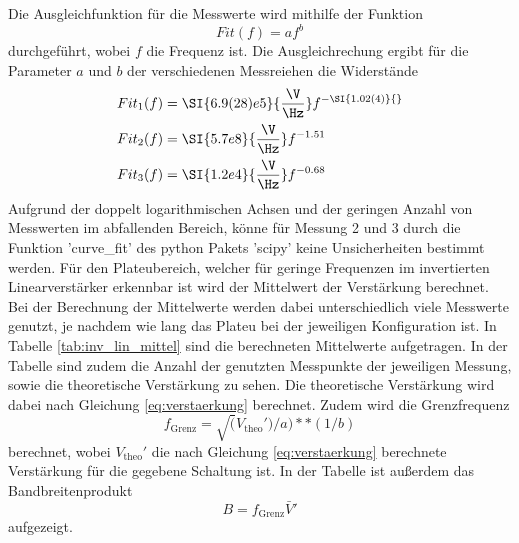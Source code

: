 Die Ausgleichfunktion für die Messwerte wird mithilfe der Funktion
\begin{equation}
    Fit(f) = a f^b
    \label{eq:fit}
\end{equation}
durchgeführt, wobei $f$ die Frequenz ist.
Die Ausgleichrechung ergibt für die Parameter $a$ und $b$ der verschiedenen Messreiehen die Widerstände
\begin{align}
    Fit_1(f) &= \SI{6.9(28)e5}{\frac{\V}{\Hz}} f^{-\SI{1.02(4)}{}} \\
    Fit_2(f) &= \SI{5.7e8}{\frac{\V}{\Hz}} f^{-1.51}\\
    Fit_3(f) &= \SI{1.2e4}{\frac{\V}{\Hz}} f^{-0.68}
\end{align}
Aufgrund der doppelt logarithmischen Achsen und der geringen Anzahl von Messwerten im abfallenden Bereich, könne für Messung 2 und 3 durch die Funktion 'curve\_fit' des python Pakets 'scipy' \cite{scipy} keine Unsicherheiten bestimmt werden.
Für den Plateubereich, welcher für geringe Frequenzen im invertierten Linearverstärker erkennbar ist wird der Mittelwert der Verstärkung berechnet.
Bei der Berechnung der Mittelwerte werden dabei unterschiedlich viele Messwerte genutzt, je nachdem wie lang das Plateu bei der jeweiligen Konfiguration ist.
In Tabelle \ref{tab:inv_lin_mittel} sind die berechneten Mittelwerte aufgetragen. 
In der Tabelle sind zudem die Anzahl der genutzten Messpunkte der jeweiligen Messung, sowie die theoretische Verstärkung zu sehen.
Die theoretische Verstärkung wird dabei nach Gleichung \eqref{eq:verstaerkung} berechnet.
Zudem wird die Grenzfrequenz 
\begin{equation*}
  f_\text{Grenz} = \sqrt(V_\text{theo}')/a)**(1/b)
\end{equation*}
berechnet, wobei $V_\text{theo}'$ die nach Gleichung \eqref{eq:verstaerkung} berechnete Verstärkung für die gegebene Schaltung ist.
In der Tabelle ist außerdem das Bandbreitenprodukt
\begin{equation*}
    B = f_\text{Grenz}\bar{V}'
\end{equation*}
aufgezeigt.
\begin{table}
    \centering
    \label{tab:inv_lin_mittel}
\end{table} 
